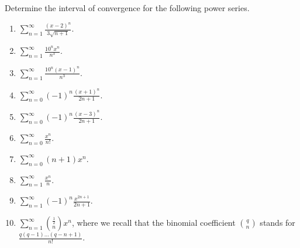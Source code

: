 Determine the interval of convergence for the following power series. 
\begin{enumerate}[ref={\fcProblemRef}]
\item \label{problemIntervalConvergence_sum(x-2)^n/(3sqrt(n+1))} $\displaystyle \sum_{ n=1}^{ \infty} \frac{(x-2)^n}{3\sqrt{n+1}}.$

\answer{$x\in [1, 3)$.}
\item $\displaystyle \sum \limits_{n= 1}^{\infty} \frac{ 10^nx^n}{n^3}$.

\item $\displaystyle \sum \limits_{n= 1}^{\infty} \frac{ 10^n(x-1)^n}{n^3}$.

\item $\displaystyle \sum\limits_{n=0}^{\infty}(-1)^n \frac{(x+1)^n }{ 2n+1} $.

\answer{$x\in (-2, 0]$.}
\item $\displaystyle \sum\limits_{n=0}^{\infty}(-1)^n \frac{(x- 3)^n }{ 2n+1} $.

\answer{$x\in (2, 4]$.}
\item $\displaystyle \sum\limits_{n=0}^{\infty} \frac{x^n}{n!}$.

\item $\displaystyle \sum\limits_{n=0}^{\infty} (n+1)x^n $.

\item $\displaystyle \sum\limits_{n=1}^{\infty} \frac{x^n}{n}$.

\answer{converges for $|x|\in[-1,1)$.}
\item $\displaystyle\sum \limits_{n=1}^{\infty} (-1)^n\frac{x^{2n+1}}{2n+1}$.

\answer{converges for $|x|\in (-1, 1]$.}
\item $\displaystyle \sum\limits_{n=1}^{\infty} \binom{\frac{1}{2}}{n}x^{n}$, where we recall that the binomial coefficient $\displaystyle \binom{q}{n}$ stands for $\displaystyle\frac{q (q-1)\dots (q-n+1)}{n!}$.

\answer{converges for $x\in (-1,1]$. } 
\end{enumerate}